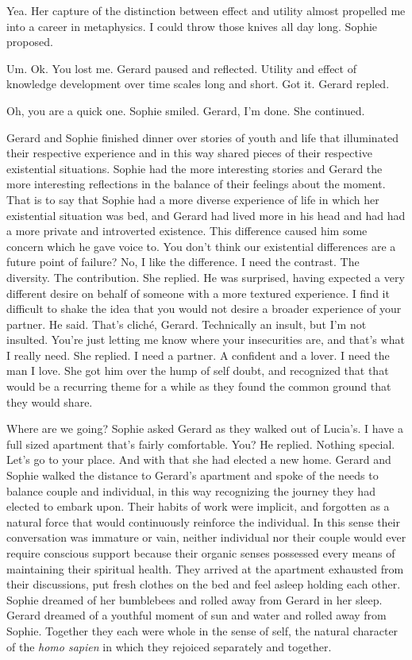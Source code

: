 Yea.  Her capture of the distinction between effect and utility almost
propelled me into a career in metaphysics.  I could throw those knives
all day long.  Sophie proposed.

Um.  Ok.  You lost me.  Gerard paused and reflected.  Utility and
effect of knowledge development over time scales long and short.  Got
it.  Gerard repled.

Oh, you are a quick one.  Sophie smiled.  Gerard, I'm done.  She
continued.



Gerard and Sophie finished dinner over stories of youth and life that
illuminated their respective experience and in this way shared pieces
of their respective existential situations.  Sophie had the more
interesting stories and Gerard the more interesting reflections in the
balance of their feelings about the moment.  That is to say that
Sophie had a more diverse experience of life in which her existential
situation was bed, and Gerard had lived more in his head and had had a
more private and introverted existence.  This difference caused him
some concern which he gave voice to.  You don't think our existential
differences are a future point of failure?  No, I like the difference.
I need the contrast.  The diversity.  The contribution.  She replied.
He was surprised, having expected a very different desire on behalf of
someone with a more textured experience.  I find it difficult to shake
the idea that you would not desire a broader experience of your
partner.  He said.  That's clich\'e, Gerard.  Technically an insult,
but I'm not insulted.  You're just letting me know where your
insecurities are, and that's what I really need.  She replied.  I need
a partner.  A confident and a lover.  I need the man I love.  She got
him over the hump of self doubt, and recognized that that would be a
recurring theme for a while as they found the common ground that they
would share.

Where are we going?  Sophie asked Gerard as they walked out of
Lucia's.  I have a full sized apartment that's fairly comfortable.
You?  He replied.  Nothing special.  Let's go to your place.  And with
that she had elected a new home.  Gerard and Sophie walked the
distance to Gerard's apartment and spoke of the needs to balance
couple and individual, in this way recognizing the journey they had
elected to embark upon.  Their habits of work were implicit, and
forgotten as a natural force that would continuously reinforce the
individual.  In this sense their conversation was immature or vain,
neither individual nor their couple would ever require conscious
support because their organic senses possessed every means of
maintaining their spiritual health.  They arrived at the apartment
exhausted from their discussions, put fresh clothes on the bed and
feel asleep holding each other.  Sophie dreamed of her bumblebees and
rolled away from Gerard in her sleep.  Gerard dreamed of a youthful
moment of sun and water and rolled away from Sophie.  Together they
each were whole in the sense of self, the natural character of the
{\it homo sapien} in which they rejoiced separately and together.

